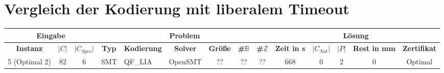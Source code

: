 \section{Vergleich der Kodierung mit liberalem Timeout}
\begin{landscape}
    \begin{table}[H]
        \centering
        \begin{tabular}{|c|c|c|c|l|c|c|c|c|c|c|c|c|c|}
            \hline
            \multicolumn{3}{|c|}{\textbf{Eingabe}} & \multicolumn{6}{|c|}{\textbf{Problem}} & \multicolumn{5}{|c|}{\textbf{Lösung}} \\
            \hline
            \textbf{Instanz} & \textbf{$\lvert C \rvert$} & \textbf{$\lvert C_{Spec} \rvert$} & \textbf{Typ} & \textbf{Kodierung} & \textbf{Solver} & \textbf{Größe} & \textbf{\#$\mathbb{B}$} & \textbf{\#$\mathbb{Z}$} & \textbf{Zeit in s} & \textbf{$\lvert C_{Not} \rvert$} & \textbf{$\lvert P \rvert$} & \textbf{Rest in mm} & \textbf{Zertifikat} \\
            \hline
            \hline
            5 (Optimal 2) & 82 & 6 & SMT & QF\_LIA & OpenSMT & ?? & ?? & ?? & 668 & 0 & 2 & 0 & Optimal \\
            \hline

\end{tabular}
\end{table}
\end{landscape}
